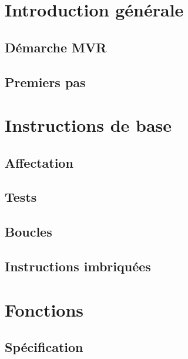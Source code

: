 \documentclass[11pt,a4paper,colorlinks,breaklinks]{book}
\begin{document}
\setcounter{tocdepth}{1}
\tableofcontents

\part{Introduction générale}\label{introduction}
%
\chapter{Démarche MVR}\label{demarche}
	
%
\chapter{Premiers pas}
	
%
%
\part{Instructions de base}\label{instructions}

\chapter{Affectation}\label{instructions:affectations}
	

\chapter{Tests}\label{instructions:tests}
	
%
\chapter{Boucles}\label{instructions:boucles}
	
%
\chapter{Instructions imbriquées}\label{instructions:imbrication}
	
%
%
\part{Fonctions}\label{fonctions}
%
\chapter{Spécification}\label{fonctions:specification}
%	
%
\end{document}
